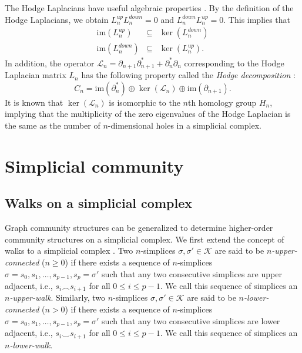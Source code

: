 \documentclass[10pt, letterpaper]{article}
\begin{document}
The Hodge Laplacians have useful algebraic properties \cite{Baccini2022, Krishnagopal2021}. By the definition of the Hodge Laplacians, we obtain $L^{up}_{n}L^{down}_{n}=0$ and $L^{down}_{n}L^{up}_{n}=0$. This implies that
\begin{eqnarray}
\textrm{im}(L^{up}_{n}) &\subseteq& \ker(L^{down}_{n}) \nonumber \\
\textrm{im}(L^{down}_{n}) &\subseteq& \ker(L^{up}_{n}).
\end{eqnarray}
In addition, the operator $\mathcal{L}_{n}=\partial_{n+1}\partial_{n+1}^{*}+\partial_{n}^{*}\partial_{n}$ corresponding to the Hodge Laplacian matrix $L_{n}$ has the following property called the \textit{Hodge decomposition} \cite{Lim2020}:
\begin{equation}
C_{n}=\textrm{im}(\partial_{n}^{*})\oplus\ker(\mathcal{L}_{n})\oplus\textrm{im}(\partial_{n+1}).
\end{equation}
It is known that $\ker(\mathcal{L}_{n})$ is isomorphic to the $n$th homology group $H_n$, implying that the multiplicity of the zero eigenvalues of the Hodge Laplacian is the same as the number of $n$-dimensional holes in a simplicial complex.



\section{Simplicial community} \label{secsimsomm}

\subsection{Walks on a simplicial complex}
Graph community structures can be generalized to determine higher-order community structures on a simplicial complex. We first extend the concept of walks to a simplicial complex \cite{Hernandez2020}. Two $n$-simplices $\sigma, \sigma'\in\mathcal{K}$ are said to be \textit{$n$-upper-connected} ($n\geq 0$) if there exists a sequence of $n$-simplices $\sigma=s_0, s_1, \ldots, s_{p-1}, s_{p}=\sigma'$ such that any two consecutive simplices are upper adjacent, i.e., $s_{i}\frown s_{i+1}$ for all $0\leq i\leq p-1$. We call this sequence of simplices an \textit{$n$-upper-walk}. Similarly, two $n$-simplices $\sigma, \sigma'\in\mathcal{K}$ are said to be \textit{$n$-lower-connected} ($n>0$) if there exists a sequence of $n$-simplices $\sigma=s_0, s_1, \ldots, s_{p-1}, s_{p}=\sigma'$ such that any two consecutive simplices are lower adjacent, i.e., $s_{i}\smile s_{i+1}$ for all $0\leq i\leq p-1$. We call this sequence of simplices an \textit{$n$-lower-walk}.
\end{document}
